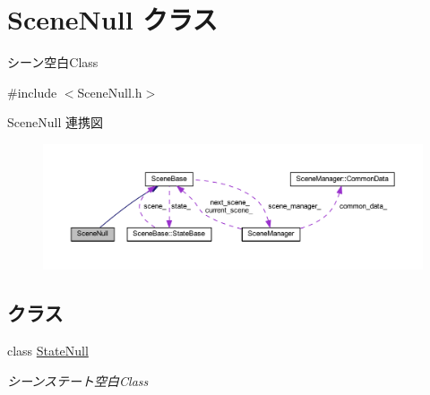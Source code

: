 \hypertarget{class_scene_null}{}\section{Scene\+Null クラス}
\label{class_scene_null}


シーン空白\+Class  




{\ttfamily \#include $<$Scene\+Null.\+h$>$}



Scene\+Null 連携図\nopagebreak
\begin{figure}[H]
\begin{center}
\leavevmode
\includegraphics[width=350pt]{class_scene_null__coll__graph}
\end{center}
\end{figure}
\subsection*{クラス}
\begin{DoxyCompactItemize}
\item 
class \mbox{\hyperlink{class_scene_null_1_1_state_null}{State\+Null}}
\begin{DoxyCompactList}\small\item\em シーンステート空白\+Class \end{DoxyCompactList}\end{DoxyCompactItemize}
